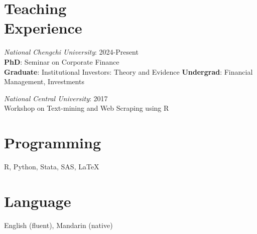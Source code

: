 \documentclass[margin]{res} %
\begin{document}
\begin{resume}
\section{Teaching\\ Experience}

\textit{National Chengchi University}: \hfill 2024-Present \\
\textbf{PhD}: Seminar on Corporate Finance \\
\textbf{Graduate}: Institutional Investors: Theory and Evidence
\textbf{Undergrad}: Financial Management, Investments

\textit{National Central University}: \hfill 2017\\
Workshop on Text-mining and Web Scraping using R



\section{Programming}

R, Python, Stata, SAS, \LaTeX


\section{Language}

English (fluent), Mandarin (native)


\end{resume}
\end{document}
